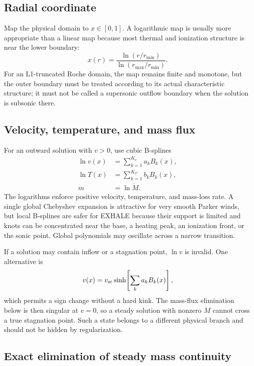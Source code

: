 \documentclass[english,a4paper]{my_memo}
\newcommand{\mdot}{\dot M}
\begin{document}
\subsection{Radial coordinate}

Map the physical domain to \(x\in[0,1]\).  A logarithmic map is usually more
appropriate than a linear map because most thermal and ionization structure is
near the lower boundary:
\begin{equation}
 x(r)=\frac{\ln(r/r_{\min})}{\ln(r_{\max}/r_{\min})}.
 \label{eq:coord}
\end{equation}
For an L1-truncated Roche domain, the map remains finite and monotone, but the
outer boundary must be treated according to its actual characteristic structure;
it must not be called a supersonic outflow boundary when the solution is
subsonic there.

\subsection{Velocity, temperature, and mass flux}

For an outward solution with \(v>0\), use cubic B-splines
\begin{align}
 \ln v(x) &= \sum_{k=1}^{K_v}a_k B_k(x),\\
 \ln T(x) &= \sum_{k=1}^{K_T}b_k B_k(x),\\
 m &= \ln\mdot.
 \label{eq:splines}
\end{align}
The logarithms enforce positive velocity, temperature, and mass-loss rate.  A
single global Chebyshev expansion is attractive for very smooth Parker winds,
but local B-splines are safer for EXHALE because their support is limited and
knots can be concentrated near the base, a heating peak, an ionization front,
or the sonic point.  Global polynomials may oscillate across a narrow transition.

If a solution may contain inflow or a stagnation point, \(\ln v\) is invalid.
One alternative is
\begin{equation}
  v(x)=v_{\rm sc}\sinh\!\left[\sum_k a_kB_k(x)\right],
  \label{eq:signedv}
\end{equation}
which permits a sign change without a hard kink.  The mass-flux elimination
below is then singular at \(v=0\), so a steady solution with nonzero \(\mdot\)
cannot cross a true stagnation point.  Such a state belongs to a different
physical branch and should not be hidden by regularization.

\subsection{Exact elimination of steady mass continuity}
\end{document}
